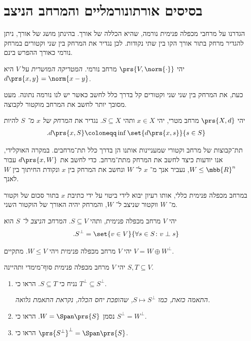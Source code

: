 \documentclass[a4paper,10pt,twoside,openany]{book}
\begin{document}
\section{בסיסים אורתונורמליים והמרחב הניצב}

הגדרנו על מרחבי מכפלה פנימית נורמה, שהיא הכללה של אורך. בהינתן מושג של אורך, ניתן להגדיר מרחק בתור אורך הקו בין שתי נקודות. לכן נגדיר את המרחק בין שני וקטורים במרחק נורמי כאורך ההפרש בינם.

\begin{definition}
יהי
$\prs{V,\norm{\cdot}}$
מרחב נורמי.
\emph{המטריקה המושרית}
על
$V$
היא
$d\prs{x,y} = \norm{x-y}$.
\end{definition}

כעת, את המרחק בין שני שני וקטורים קל בדרך כלל לחשב כאשר יש לנו נורמה נתונה. מעט מסובך יותר לחשב את המרחב מוקטור לקבוצה.

\begin{definition}
יהי
$\prs{X,d}$
מרחב מטרי, יהי
$x \in X$
ותהי
$S \subseteq X$.
נגדיר את
\emph{המרחק של
$x$
מ־%
$S$}
להיות
\begin{align*}
\text{.} d\prs{x,S} \coloneqq \inf\set{d\prs{x,s}}{s \in S}
\end{align*}
\end{definition}

תת־קבוצות של מרחב וקטורי שמעניינות אותנו הן בדרך כלל תת־מרחבים. במקרה האוקלידי, אנו יודעות כיצד לחשב את המרחק מתת־מרחב. כדי לחשב את
$d\prs{x,W}$
עבור
$W \leq \mbb{R}^n$,
נעביר אנך מ־%
$x$
ל־%
$W$
ונחשב את המרחק בין
$x$
ונקודת החיתוך בין
$W$
לאנך.

במרחב מכפלה פנימית כללי, אותו רעיון יבוא לידי ביטוי על ידי כתיבת
$x$
בתור סכום של וקטור מ־%
$W$
ווקטור שניצב ל־%
$W$,
והמרחק יהיה האורך של הוקטור השני.

\begin{definition}
יהי
$V$
מרחב מכפלה פנימית, ותהי
$S \subseteq V$.
\emph{המרחב הניצב ל־%
$S$}
הוא
\[\text{.} S^\perp = \set{v \in V}{\forall s \in S \colon v \perp s}\]
\end{definition}

\begin{proposition}
יהי
$V$
מרחב מכפלה פנימית ויהי
$W \leq V$.
מתקיים
$V = W \oplus W^\perp$.
\end{proposition}

\begin{exercisechap}
יהי
$V$
מרחב מכפלה פנימית סוף־מימדי ותהיינה
$S,T \subseteq V$.

\begin{enumerate}
\item 
נניח כי
$S \subseteq T$.
הראו כי
$T^\perp \subseteq S^\perp$.

\emph{התאמה כזאת, כמו $S \mapsto S^\perp$, שהופכת יחס הכלה, נקראת
\emph{התאמת גלואה}.}

\item
נסמן
$W = \Span\prs{S}$.
הראו כי
$S^\perp = W^\perp$.

\item
הראו כי
$\prs{S^{\perp}}^\perp = \Span\prs{S}$.
\end{enumerate}
\end{exercisechap}
\end{document}
